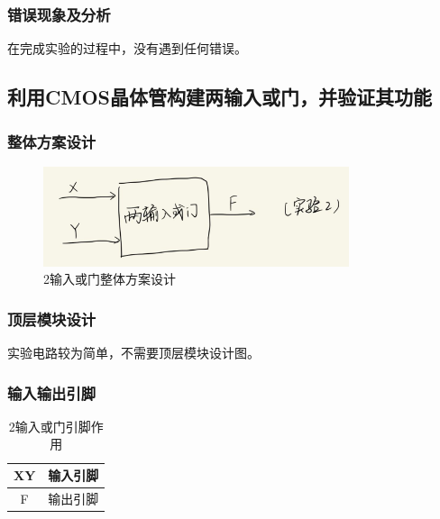 \documentclass{article}
\begin{document}
    \subsubsection{错误现象及分析}
    在完成实验的过程中，没有遇到任何错误。
    
    \subsection{利用CMOS晶体管构建两输入或门，并验证其功能}

    \subsubsection{整体方案设计}
    \begin{figure}[H]
    \centering
    \includegraphics[width=0.8\textwidth]{2.1.png}
    \caption{2输入或门整体方案设计}
    \end{figure}
    
    \subsubsection{顶层模块设计}
    实验电路较为简单，不需要顶层模块设计图。

    \subsubsection{输入输出引脚}
    \begin{table}[H]
    \centering
    \begin{tabular}{|c|c|}
        \hline
        XY & 输入引脚 \\ \hline
        F   & 输出引脚 \\ \hline
    \end{tabular}
    \caption{2输入或门引脚作用}
    \end{table}
\end{document}
